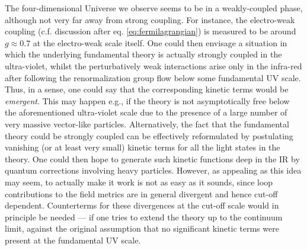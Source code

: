 
The four-dimensional Universe we observe seems to be in a weakly-coupled phase, although not very far away from strong coupling. For instance, the electro-weak coupling (c.f. discussion after eq. \eqref{eq:fermilagrangian}) is measured to be around $g \approx 0.7$ at the electro-weak scale itself. One could then envisage a situation in which the underlying fundamental theory is actually strongly coupled in the ultra-violet, whilst the perturbatively weak interactions arise only in the infra-red after following the renormalization group flow below some fundamental UV scale. Thus, in a sense, one could say that the corresponding kinetic terms would be {\it emergent}. This may happen e.g., if the theory is not asymptotically free below the aforementioned ultra-violet scale due to the presence of a large number of very massive vector-like particles. Alternatively, the fact that the fundamental theory could be strongly coupled can be effectively reformulated by postulating vanishing (or at least very small) kinetic terms for all the light states in the theory. One could then hope to generate such kinetic functions deep in the IR by quantum corrections involving heavy particles. However, as appealing as this idea may seem, to actually make it work is not as easy as it sounds, since loop contributions to the field metrics are in general divergent and hence cut-off dependent. %
Counterterms for these divergences at the cut-off scale would in principle be needed --- if one tries to extend the theory up to the continuum limit, against the original assumption that no significant kinetic terms were present at the fundamental UV scale.
	
